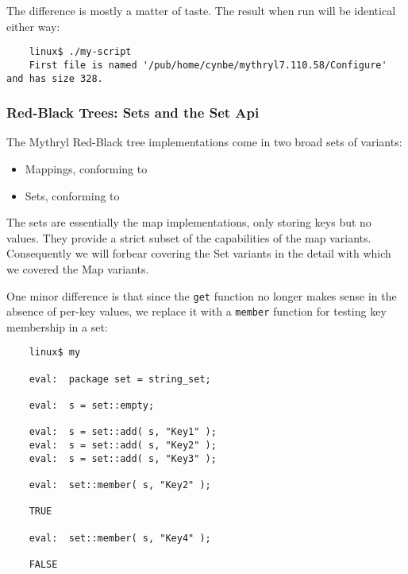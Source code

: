 The difference is mostly a matter of taste. 
The result when run will be identical either way:

\begin{verbatim}
    linux$ ./my-script
    First file is named '/pub/home/cynbe/mythryl7.110.58/Configure' and has size 328.
\end{verbatim}

\cutend*

\subsubsection{Red-Black Trees:  Sets and the Set Api}

The Mythryl Red-Black tree implementations come in two broad sets of variants:
\begin{itemize}
\item Mappings, conforming to 
\item Sets, conforming to 
\end{itemize}

The sets are essentially the map implementations, only storing keys but no values. 
They provide a strict subset of the capabilities of the map variants.  Consequently 
we will forbear covering the Set variants in the detail with which we covered the 
Map variants.

One minor difference is that since the {\tt get} function no longer makes sense in 
the absence of per-key values, we replace it with a {\tt member} function for testing 
key membership in a set:

\begin{verbatim}
    linux$ my

    eval:  package set = string_set;

    eval:  s = set::empty;

    eval:  s = set::add( s, "Key1" );
    eval:  s = set::add( s, "Key2" );
    eval:  s = set::add( s, "Key3" );

    eval:  set::member( s, "Key2" );

    TRUE

    eval:  set::member( s, "Key4" );

    FALSE
\end{verbatim}


\cutend*


\cutend*

